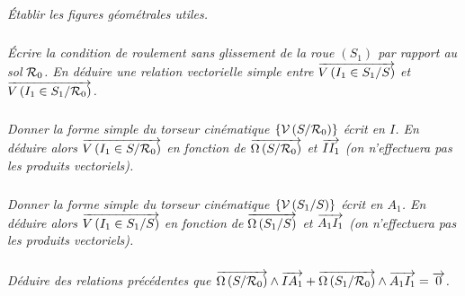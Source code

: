 \documentclass[10pt,fleqn]{article} %
\begin{document}
\begin{multicols}{2}
\subparagraph{}
\textit{Établir les figures géométrales utiles.}
\ifprof%
\begin{corrige}
\end{corrige}\else\fi

\subparagraph{}
\textit{Écrire la condition de roulement sans glissement de la roue $(S_1)$ par rapport au sol $\mathcal{R}_{0}$. En déduire une relation vectorielle simple entre $\overrightarrow{V\left( {I_1} \in {S_1}/{S}\right)}$ et $\overrightarrow{V\left( {I_1} \in {S_1}/{\mathcal{R}_{0}}\right)}$.}
\ifprof%
\begin{corrige}
\end{corrige}\else\fi

\subparagraph{}
\textit{Donner la forme simple du torseur cinématique $\left\{\mathcal{V} \left(S/\mathcal{R}_{0} \right) \right\}$ écrit en $I$. En déduire alors $\overrightarrow{V\left( {I_1} \in {S}/{\mathcal{R}_{0}}\right)}$ en fonction de $\overrightarrow{\Omega\left( {S}/{\mathcal{R}_{0}}\right)}$ et $\overrightarrow{II_1}$ (on n'effectuera pas les produits vectoriels).}
\ifprof%
\begin{corrige}
\end{corrige}\else\fi
\subparagraph{}
\textit{Donner la forme simple du torseur cinématique $\left\{\mathcal{V} \left(S_1/S \right) \right\}$ écrit en $A_1$. En déduire alors $\overrightarrow{V\left( {I_1} \in {S_1}/{S}\right)}$ en fonction de $\overrightarrow{\Omega\left( {S_1}/{S}\right)}$ et $\overrightarrow{A_1 I_1}$ (on n'effectuera pas les produits vectoriels).}
\ifprof%
\begin{corrige}
\end{corrige}\else\fi
\subparagraph{}
\textit{Déduire des relations précédentes que $\overrightarrow{\Omega\left( {S}/{\mathcal{R}_{0}}\right)}\wedge \overrightarrow{IA_1} + \overrightarrow{\Omega\left( {S_1}/{\mathcal{R}_{0}}\right)}\wedge \overrightarrow{A_1I_1}=\overrightarrow{0}$.}
\ifprof%
\begin{corrige}
\end{corrige}\else\fi
\subparagraph{}
\textit{}
\ifprof%
\begin{corrige}
\end{corrige}\else\fi
\subparagraph{}
\textit{}
\ifprof%
\begin{corrige}
\end{corrige}\else\fi
\subparagraph{}
\textit{}
\ifprof%
\begin{corrige}
\end{corrige}\else\fi
\subparagraph{}
\textit{}
\ifprof%
\begin{corrige}
\end{corrige}\else\fi
\subparagraph{}
\textit{}
\ifprof%
\begin{corrige}
\end{corrige}\else\fi
\subparagraph{}
\textit{}
\ifprof%
\begin{corrige}
\end{corrige}\else\fi
\subparagraph{}
\textit{}
\ifprof%
\begin{corrige}
\end{corrige}\else\fi





\ifprof
\else
\end{multicols}
\fi

\end{document}
